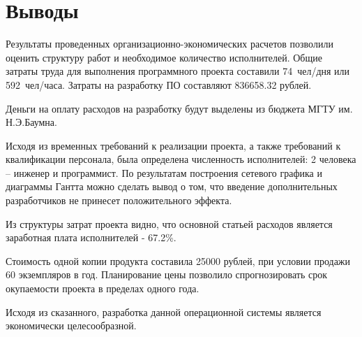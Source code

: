 \clearpage
\section{Выводы}
Результаты проведенных организационно-экономических расчетов позволили оценить структуру работ и необходимое
количество исполнителей. Общие затраты труда для выполнения программного проекта составили 74~чел/дня или 592~чел/часа.
Затраты на разработку ПО составляют 836658.32 рублей.

Деньги на оплату расходов на разработку будут выделены из бюджета МГТУ им. Н.Э.Баумна.

Исходя из временных требований к реализации проекта, а также требований к квалификации персонала, была определена
численность исполнителей: 2 человека -- инженер и программист. По результатам построения сетевого графика и
диаграммы Гантта можно сделать вывод о том, что введение дополнительных разработчиков не принесет положительного эффекта.

Из структуры затрат проекта видно, что основной статьей расходов является заработная плата исполнителей - 67.2\%.

Стоимость одной копии продукта составила 25000 рублей, при условии продажи 60 экземпляров в год.
Планирование цены позволило спрогнозировать срок окупаемости проекта в пределах одного года.

Исходя из сказанного, разработка данной операционной системы является экономически целесообразной.
